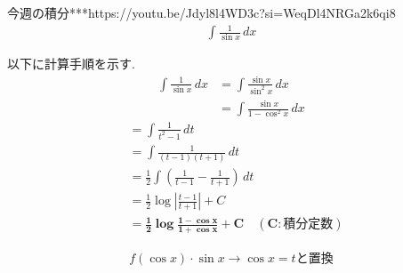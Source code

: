 \documentclass[main]{subfiles}
\begin{document}

\begin{mondai}{5}{今週の積分}{***}{https://youtu.be/Jdyl8l4WD3c?si=WeqDl4NRGa2k6qi8}
    \begin{align*}
        \int \frac{1}{\sin x} \, dx
    \end{align*}
\end{mondai}


\solutionhead
\hfill
以下に計算手順を示す.
\hfill\
\begin{align*}
    \int \frac{1}{\sin x} \, dx
        &= \int \frac{\sin x}{\sin^2 x} \, dx \\
        &= \int \frac{\sin x}{1-\cos^2 x} \, dx
\end{align*}
\begin{align*}
        &= \int \frac{1}{t^2-1} \, dt \\
        &= \int \frac{1}{(t-1)(t+1)} \, dt \\
        &= \frac{1}{2}\int \left(\frac{1}{t-1}-\frac{1}{t+1}\right) \, dt \\
        &= \frac{1}{2} \log \left|\frac{t-1}{t+1}\right|+C  \\
        &= \boldsymbol{\frac{1}{2} \log \frac{1-\cos x}{1+\cos x}+C \quad (C:\textbf{積分定数})}
\end{align*}

\begin{focusbox}
\centering
\vspace*{-0.9\baselineskip}
\begin{align*}
    f(\cos x)\cdot \sin x \rightarrow \cos x = t \text{と置換}
\end{align*}
\end{focusbox}
\end{document}

